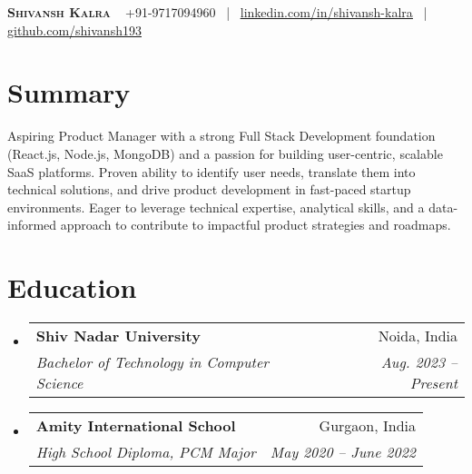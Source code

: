 \documentclass[letterpaper,11pt]{article}
\makeatletter
\newcommand{\resumeSubheading}[4]{
\vspace{-2pt}\item
\begin{tabular*}{0.97\textwidth}[t]{l@{\extracolsep{\fill}}r}
\textbf{#1} & #2 \\
\textit{\small #3} & \textit{\small #4} \\
\end{tabular*}\vspace{-7pt}
}
\newcommand{\resumeSubHeadingListStart}{\begin{itemize}[leftmargin=*]}
\newcommand{\resumeSubHeadingListEnd}{\end{itemize}}
\makeatother
\begin{document}
\begin{center}
\textbf{\Huge \scshape Shivansh Kalra} \ \vspace{1pt}
\small +91-9717094960 
~|~ %
 \href{https://linkedin.com/in/shivansh-kalra}{\underline{linkedin.com/in/shivansh-kalra}} 
~|~ %
\href{https://github.com/shivansh193}{\underline{github.com/shivansh193}}
\end{center}

\section*{Summary}
\vspace{-5pt}
\small{Aspiring Product Manager with a strong Full Stack Development foundation (React.js, Node.js, MongoDB) and a passion for building user-centric, scalable SaaS platforms. Proven ability to identify user needs, translate them into technical solutions, and drive product development in fast-paced startup environments. Eager to leverage technical expertise, analytical skills, and a data-informed approach to contribute to impactful product strategies and roadmaps.}
\vspace{4pt}

\section{Education}
\resumeSubHeadingListStart
\resumeSubheading
{Shiv Nadar University}{Noida, India}
{Bachelor of Technology in Computer Science}{Aug. 2023 -- Present}
\resumeSubheading
{Amity International School}{Gurgaon, India}
{High School Diploma, PCM Major}{May 2020 -- June 2022}
\resumeSubHeadingListEnd
\end{document}
